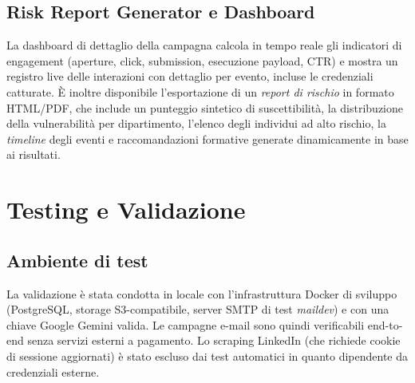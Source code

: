 \documentclass[12pt,a4paper,oneside]{report}
\begin{document}
\section{Risk Report Generator e Dashboard}
La dashboard di dettaglio della campagna calcola in tempo reale gli indicatori di
engagement (aperture, click, submission, esecuzione payload, CTR) e mostra un registro
live delle interazioni con dettaglio per evento, incluse le credenziali catturate. \`E
inoltre disponibile l'esportazione di un \emph{report di rischio} in formato HTML/PDF, che
include un punteggio sintetico di suscettibilit\`a, la distribuzione della vulnerabilit\`a
per dipartimento, l'elenco degli individui ad alto rischio, la \emph{timeline} degli eventi
e raccomandazioni formative generate dinamicamente in base ai risultati.

\chapter{Testing e Validazione}

\section{Ambiente di test}
La validazione \`e stata condotta in locale con l'infrastruttura Docker di sviluppo
(PostgreSQL, storage S3-compatibile, server SMTP di test \emph{maildev}) e con una chiave
Google Gemini valida. Le campagne e-mail sono quindi verificabili end-to-end senza servizi
esterni a pagamento. Lo scraping LinkedIn (che richiede cookie di sessione aggiornati) \`e
stato escluso dai test automatici in quanto dipendente da credenziali esterne.
\end{document}
